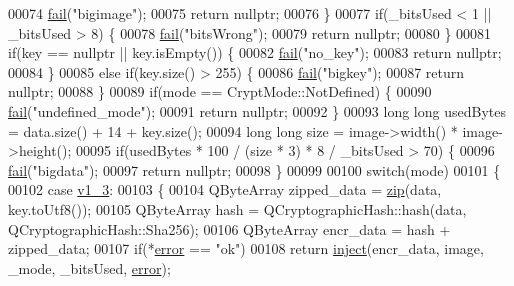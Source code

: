 \begin{DoxyCode}
00074         \hyperlink{class_model_p_c_a47464b59b7e37fcee25e55475708aabd}{fail}(\textcolor{stringliteral}{"bigimage"});
00075         \textcolor{keywordflow}{return} \textcolor{keyword}{nullptr};
00076     \}
00077     \textcolor{keywordflow}{if}(\_bitsUsed < 1 || \_bitsUsed > 8) \{
00078         \hyperlink{class_model_p_c_a47464b59b7e37fcee25e55475708aabd}{fail}(\textcolor{stringliteral}{"bitsWrong"});
00079         \textcolor{keywordflow}{return} \textcolor{keyword}{nullptr};
00080     \}
00081     \textcolor{keywordflow}{if}(key == \textcolor{keyword}{nullptr} || key.isEmpty()) \{
00082         \hyperlink{class_model_p_c_a47464b59b7e37fcee25e55475708aabd}{fail}(\textcolor{stringliteral}{"no\_key"});
00083         \textcolor{keywordflow}{return} \textcolor{keyword}{nullptr};
00084     \}
00085     \textcolor{keywordflow}{else} \textcolor{keywordflow}{if}(key.size() > 255) \{
00086         \hyperlink{class_model_p_c_a47464b59b7e37fcee25e55475708aabd}{fail}(\textcolor{stringliteral}{"bigkey"});
00087         \textcolor{keywordflow}{return} \textcolor{keyword}{nullptr};
00088     \}
00089     \textcolor{keywordflow}{if}(mode == CryptMode::NotDefined) \{
00090         \hyperlink{class_model_p_c_a47464b59b7e37fcee25e55475708aabd}{fail}(\textcolor{stringliteral}{"undefined\_mode"});
00091         \textcolor{keywordflow}{return} \textcolor{keyword}{nullptr};
00092     \}
00093     \textcolor{keywordtype}{long} \textcolor{keywordtype}{long} usedBytes = data.size() + 14 + key.size();
00094     \textcolor{keywordtype}{long} \textcolor{keywordtype}{long} size = image->width() * image->height();
00095     \textcolor{keywordflow}{if}(usedBytes * 100 / (size * 3) * 8 / \_bitsUsed > 70) \{
00096         \hyperlink{class_model_p_c_a47464b59b7e37fcee25e55475708aabd}{fail}(\textcolor{stringliteral}{"bigdata"});
00097         \textcolor{keywordflow}{return} \textcolor{keyword}{nullptr};
00098     \}
00099 
00100     \textcolor{keywordflow}{switch}(mode)
00101     \{
00102         \textcolor{keywordflow}{case} \hyperlink{class_model_p_c_a296dd7afe3e1c49b3da25fd644fe4ceba7612e38de7178170655a56ddcf96e12c}{v1\_3}:
00103         \{
00104             QByteArray zipped\_data = \hyperlink{class_model_p_c_afebbbfa4b07deba4f68fc6dfb50f353f}{zip}(data, key.toUtf8());
00105             QByteArray hash = QCryptographicHash::hash(data, QCryptographicHash::Sha256);
00106             QByteArray encr\_data = hash + zipped\_data;
00107             \textcolor{keywordflow}{if}(*\hyperlink{class_model_p_c_a4e5a9c0ca1f06fe5bc478b6bf248c37c}{error} == \textcolor{stringliteral}{"ok"})
00108                 \textcolor{keywordflow}{return} \hyperlink{class_model_p_c_aada6a04d81ada8f2b4ba18108c8d6f10}{inject}(encr\_data, image, \_mode, \_bitsUsed, \hyperlink{class_model_p_c_a4e5a9c0ca1f06fe5bc478b6bf248c37c}{error});

\end{DoxyCode}
